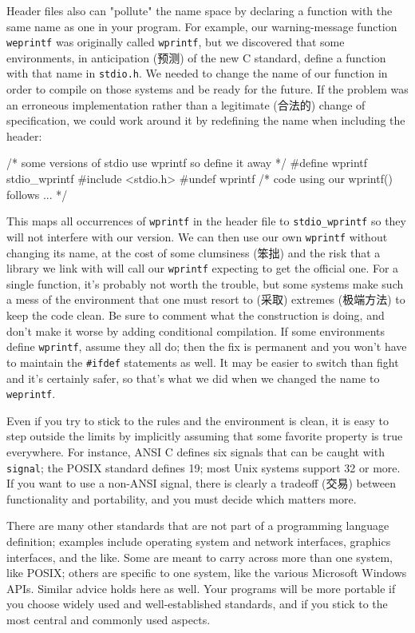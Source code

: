 Header files also can "pollute" the name space by declaring a function with
the same name as one in your program. For example, our warning-message
function \verb'weprintf' was originally called \verb'wprintf', but we
discovered that some environments, in anticipation (预测) of the new C
standard, define a function with that name in \verb'stdio.h'.  We needed to
change the name of our function in order to compile on those systems and be
ready for the future. If the problem was an erroneous implementation rather
than a legitimate (合法的) change of specification, we could work around it
by redefining the name when including the header:
\begin{badcode}
    /* some versions of stdio use wprintf so define it away */
    #define wprintf stdio_wprintf
    #include <stdio.h>
    #undef wprintf
    /* code using our wprintf() follows ... */
\end{badcode}
This maps all occurrences of \verb'wprintf' in the header file to
\verb'stdio_wprintf' so they will not interfere with our version. We can
then use our own \verb'wprintf' without changing its name, at the cost of
some clumsiness (笨拙) and the risk that a library we link with will call
our \verb'wprintf' expecting to get the official one. For a single
function, it's probably not worth the trouble, but some systems make such a
mess of the environment that one must resort to (采取) extremes (极端方法)
to keep the code clean. Be sure to comment what the construction is doing,
and don't make it worse by adding conditional compilation. If some
environments define \verb'wprintf', assume they all do; then the fix is
permanent and you won't have to maintain the \verb'#ifdef' statements as
well.  It may be easier to switch than fight and it's certainly safer, so
that's what we did when we changed the name to \verb'weprintf'.

Even if you try to stick to the rules and the environment is clean, it is
easy to step outside the limits by implicitly assuming that some favorite
property is true everywhere. For instance, ANSI C defines six signals that
can be caught with \verb'signal'; the POSIX standard defines 19; most Unix
systems support 32 or more. If you want to use a non-ANSI signal, there is
clearly a tradeoff (交易) between functionality and portability, and you
must decide which matters more.

There are many other standards that are not part of a programming language
definition; examples include operating system and network interfaces,
graphics interfaces, and the like. Some are meant to carry across more than
one system, like POSIX; others are specific to one system, like the various
Microsoft Windows APIs.  Similar advice holds here as well. Your programs
will be more portable if you choose widely used and well-established
standards, and if you stick to the most central and commonly used aspects.

